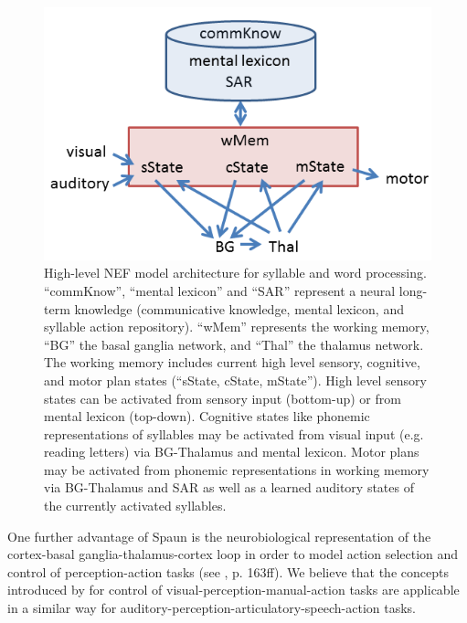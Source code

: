 \documentclass[conference]{IEEEtran}
\begin{document}
\begin{figure}[!t]
\centering
\includegraphics[width=\columnwidth]{model}
\caption{High-level NEF model architecture for syllable and word processing.
  ``commKnow'', ``mental lexicon'' and ``SAR'' represent a neural long-term knowledge
  (communicative knowledge, mental lexicon, and syllable action
  repository). ``wMem'' represents the working memory, ``BG'' the
  basal ganglia network, and ``Thal'' the thalamus
  network. The working memory includes current high level sensory, cognitive, and
  motor plan states (``sState, cState, mState''). High level sensory states can
  be activated from sensory input (bottom-up) or from mental lexicon (top-down).
  Cognitive states like phonemic representations of syllables may be activated
  from visual input (e.g. reading letters) via BG-Thalamus and mental lexicon. Motor plans may
  be activated from phonemic representations in working memory via BG-Thalamus
  and SAR as well as a learned auditory states of the currently activated syllables.}
\label{fig:model}
\end{figure}

One further advantage of Spaun is the neurobiological representation
of the cortex-basal ganglia-thalamus-cortex loop in order to model
action selection and control of perception-action tasks
(see \cite{eliasmith2013}, p. 163ff). We believe that the concepts
introduced by \cite{eliasmith2013} for control of
visual-perception-manual-action tasks are applicable in a similar way
for auditory-perception-articulatory-speech-action tasks.
\end{document}

